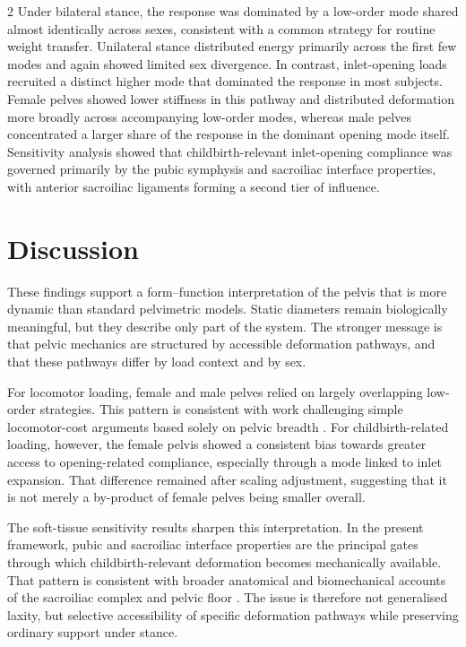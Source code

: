 \documentclass[openacc]{rsproca_new}
\begin{document}
\begin{multicols}{2}
Under bilateral stance, the response was dominated by a low-order mode shared almost identically across sexes, consistent with a common strategy for routine weight transfer. Unilateral stance distributed energy primarily across the first few modes and again showed limited sex divergence. In contrast, inlet-opening loads recruited a distinct higher mode that dominated the response in most subjects. Female pelves showed lower stiffness in this pathway and distributed deformation more broadly across accompanying low-order modes, whereas male pelves concentrated a larger share of the response in the dominant opening mode itself. Sensitivity analysis showed that childbirth-relevant inlet-opening compliance was governed primarily by the pubic symphysis and sacroiliac interface properties, with anterior sacroiliac ligaments forming a second tier of influence.

\section{Discussion}

These findings support a form--function interpretation of the pelvis that is more dynamic than standard pelvimetric models. Static diameters remain biologically meaningful, but they describe only part of the system. The stronger message is that pelvic mechanics are structured by accessible deformation pathways, and that these pathways differ by load context and by sex.

For locomotor loading, female and male pelves relied on largely overlapping low-order strategies. This pattern is consistent with work challenging simple locomotor-cost arguments based solely on pelvic breadth \cite{Warrener2015,Grunstra2023}. For childbirth-related loading, however, the female pelvis showed a consistent bias towards greater access to opening-related compliance, especially through a mode linked to inlet expansion. That difference remained after scaling adjustment, suggesting that it is not merely a by-product of female pelves being smaller overall.

The soft-tissue sensitivity results sharpen this interpretation. In the present framework, pubic and sacroiliac interface properties are the principal gates through which childbirth-relevant deformation becomes mechanically available. That pattern is consistent with broader anatomical and biomechanical accounts of the sacroiliac complex and pelvic floor \cite{Vleeming2012,Stansfield2021a,Pink2024}. The issue is therefore not generalised laxity, but selective accessibility of specific deformation pathways while preserving ordinary support under stance.


\end{multicols}
\end{document}
